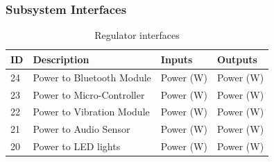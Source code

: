 \subsubsection{Subsystem Interfaces}

\begin{table}[H]
\caption{Regulator interfaces}
\begin{center}
\begin{tabular}{|l|l|l|l|}
    \hline
    ID & Description & Inputs & Outputs \\ \hline
    24 & Power to Bluetooth Module & Power (W) & Power (W) \\ \hline
    23 & Power to Micro-Controller & Power (W) & Power (W) \\ \hline
    22 & Power to Vibration Module & Power (W) & Power (W) \\ \hline
    21 & Power to Audio Sensor & Power (W) & Power (W) \\ \hline
    20 & Power to LED lights & Power (W) & Power (W) \\ \hline
\end{tabular}
\end{center}
\end{table}
